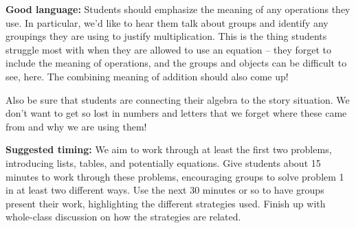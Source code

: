 \documentclass{ximera}
\begin{document}
\begin{instructorNotes}
{\bf Good language:} Students should emphasize the meaning of any operations they use. In particular, we'd like to hear them talk about groups and identify any groupings they are using to justify multiplication. This is the thing students struggle most with when they are allowed to use an equation -- they forget to include the meaning of operations, and the groups and objects can be difficult to see, here. The combining meaning of addition should also come up!

Also be sure that students are connecting their algebra to the story situation. We don't want to get so lost in numbers and letters that we forget where these came from and why we are using them!

{\bf Suggested timing:} We aim to work through at least the first two problems, introducing lists, tables, and potentially equations. Give students about 15 minutes to work through these problems, encouraging groups to solve problem 1 in at least two different ways.
Use the next 30 minutes or so to have groups present their work, highlighting the different strategies used. Finish up with whole-class discussion on how the strategies are related.


\end{instructorNotes}
\end{document}
